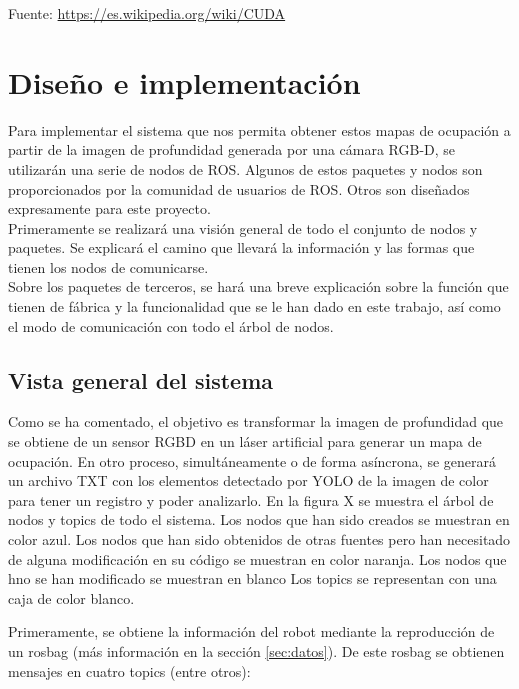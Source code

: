 Fuente: \url{https://es.wikipedia.org/wiki/CUDA}\\


\chapter{Diseño e implementación}

Para implementar el sistema que nos permita obtener estos mapas de ocupación a partir de la imagen de profundidad generada por una cámara RGB-D, se utilizarán una serie de nodos de ROS. Algunos de estos paquetes y nodos son proporcionados por la comunidad de usuarios de ROS. Otros son diseñados expresamente para este proyecto.\\

Primeramente se realizará una visión general de todo el conjunto de nodos y paquetes. Se explicará el camino que llevará la información y las formas que tienen los nodos de comunicarse.\\

Sobre los paquetes de terceros, se hará una breve explicación sobre la función que tienen de fábrica y la funcionalidad que se le han dado en este trabajo, así como el modo de comunicación con todo el árbol de nodos.\\

\section{Vista general del sistema}

Como se ha comentado, el objetivo es transformar la imagen de profundidad que se obtiene de un sensor RGBD en un láser artificial para generar un mapa de ocupación. En otro proceso, simultáneamente o de forma asíncrona, se generará un archivo TXT con los elementos detectado por YOLO de la imagen de color para tener un registro y poder analizarlo. En la figura X se muestra el árbol de nodos y topics de todo el sistema. Los nodos que han sido creados se muestran en color azul. Los nodos que han sido obtenidos de otras fuentes pero han necesitado de alguna modificación en su código se muestran en color naranja. Los nodos que hno se han modificado se muestran en blanco Los topics se representan con una caja de color blanco.\\


Primeramente, se obtiene la información del robot mediante la reproducción de un rosbag (más información en la sección \ref{sec:datos}). De este rosbag se obtienen mensajes en cuatro topics (entre otros): 

